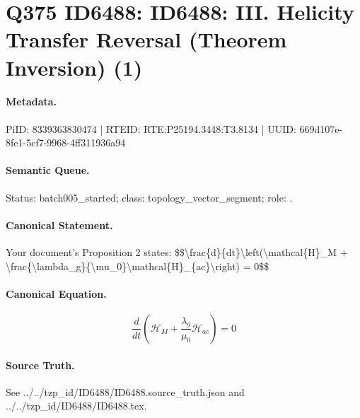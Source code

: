 \section*{Q375 ID6488: ID6488: III. Helicity Transfer Reversal (Theorem Inversion) (1)}
\paragraph{Metadata.}
PiID: 8339363830474 | RTEID: RTE:P25194.3448:T3.8134 | UUID: 669d107e-8fe1-5cf7-9968-4ff311936a94

\paragraph{Semantic Queue.}
Status: batch005\_started; class: topology\_vector\_segment; role: .

\paragraph{Canonical Statement.}
Your document's Proposition 2 states: \$\$\textbackslash{}frac\{d\}\{dt\}\textbackslash{}left(\textbackslash{}mathcal\{H\}\_M + \textbackslash{}frac\{\textbackslash{}lambda\_g\}\{\textbackslash{}mu\_0\}\textbackslash{}mathcal\{H\}\_\{ac\}\textbackslash{}right) = 0\$\$

\paragraph{Canonical Equation.}
\[
\frac{d}{dt}\left(\mathcal{H}_M + \frac{\lambda_g}{\mu_0}\mathcal{H}_{ac}\right) = 0
\]

\paragraph{Source Truth.}
See ../../tzp\_id/ID6488/ID6488.source\_truth.json and ../../tzp\_id/ID6488/ID6488.tex.
